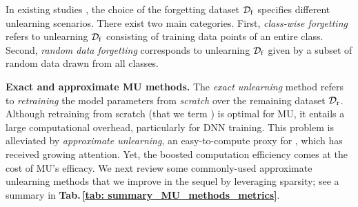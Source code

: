 In existing studies \cite{golatkar2020eternal,graves2021amnesiac,bourtoule2021machine}, the choice of the forgetting dataset $\mathcal D_\mathrm{f}$ specifies different unlearning scenarios. 
There exist two main categories. 
{First}, \textit{class-wise forgetting} \cite{golatkar2020eternal,graves2021amnesiac} refers to  unlearning $\mathcal D_\mathrm{f}$ consisting of training data points of an entire class. 
Second, \textit{random data forgetting} corresponds to unlearning $\mathcal D_\mathrm{f}$  given by a  subset of random data drawn from all classes.









%
%

\noindent \textbf{Exact and approximate MU methods.} The \textit{exact unlearning}  method refers to 
\textit{retraining} the model parameters  from \textit{scratch} over the remaining dataset $\mathcal D_\mathrm{r}$. 
Although retraining from scratch (that we term  \textbf{\retrain})
is optimal for MU, it entails a large computational overhead, particularly for DNN training. This problem is alleviated by \textit{approximate unlearning}, an easy-to-compute proxy for {\retrain}, which has received growing attention.
Yet,   the boosted computation efficiency   comes at the cost of  MU's  efficacy. %
We next review some commonly-used approximate unlearning methods that we improve in the sequel by leveraging sparsity; see a summary in  \textbf{Tab.\,\ref{tab: summary_MU_methods_metrics}}. 

